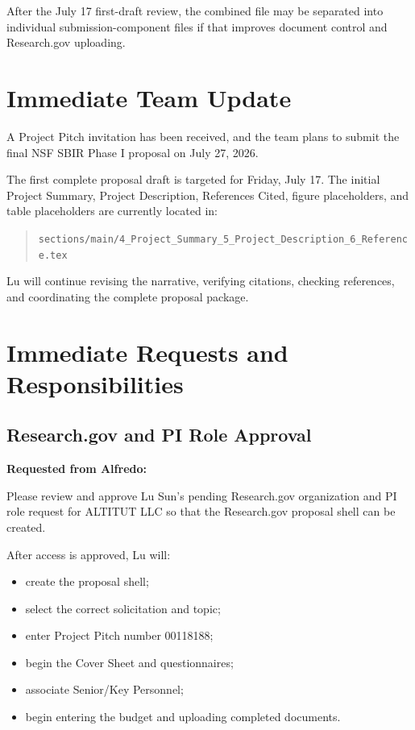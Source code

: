 \documentclass[11pt,letterpaper]{article}
\begin{document}
After the July 17 first-draft review, the combined file may be separated into
individual submission-component files if that improves document control and
Research.gov uploading.

\section{Immediate Team Update}

A Project Pitch invitation has been received, and the team plans to submit the
final NSF SBIR Phase I proposal on July 27, 2026.

The first complete proposal draft is targeted for Friday, July 17. The initial
Project Summary, Project Description, References Cited, figure placeholders,
and table placeholders are currently located in:

\begin{quote}
\texttt{sections/main/4\_Project\_Summary\_5\_Project\_Description\_6\_Reference.tex}
\end{quote}

Lu will continue revising the narrative, verifying citations, checking
references, and coordinating the complete proposal package.

\section{Immediate Requests and Responsibilities}

\subsection{Research.gov and PI Role Approval}

\textbf{Requested from Alfredo:}

Please review and approve Lu Sun's pending Research.gov organization and PI
role request for ALTITUT LLC so that the Research.gov proposal shell can be
created.

After access is approved, Lu will:

\begin{itemize}[leftmargin=0.25in]
    \item create the proposal shell;
    \item select the correct solicitation and topic;
    \item enter Project Pitch number 00118188;
    \item begin the Cover Sheet and questionnaires;
    \item associate Senior/Key Personnel;
    \item begin entering the budget and uploading completed documents.
\end{itemize}
\end{document}
